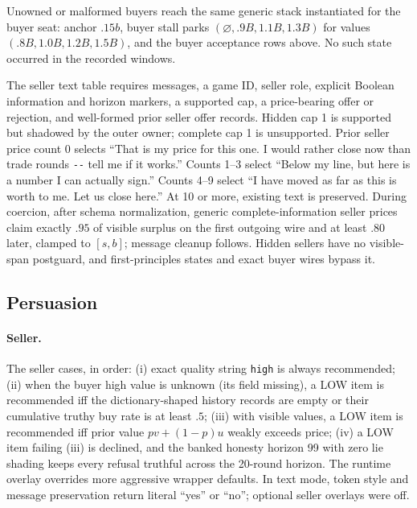 Unowned or malformed buyers reach the same generic stack instantiated for the
buyer seat: anchor $.15b$, buyer stall parks $(\varnothing,.9B,1.1B,1.3B)$
for values $(.8B,1.0B,1.2B,1.5B)$, and the buyer acceptance rows above. No
such state occurred in the recorded windows.

The seller text table requires messages, a game ID, seller role, explicit
Boolean information and horizon markers, a supported cap, a price-bearing offer
or rejection, and well-formed prior seller offer records. Hidden cap 1 is
supported but shadowed by the outer owner; complete cap 1 is unsupported. Prior
seller price count 0 selects ``That is my price for this one. I would rather
close now than trade rounds \texttt{-{}-} tell me if it works.'' Counts 1--3
select ``Below my line, but here is a number I can actually sign.'' Counts 4--9
select ``I have moved as far as this is worth to me. Let us close here.'' At 10
or more, existing text is preserved. During coercion, after schema
normalization, generic complete-information seller prices claim exactly $.95$
of visible surplus on the first outgoing wire and at least $.80$ later, clamped
to $[s,b]$; message cleanup follows. Hidden sellers have no visible-span
postguard, and first-principles states and exact buyer wires bypass it.

\subsection{Persuasion}
\label{app:policy-persuasion}

\paragraph{Seller.}
The seller cases, in order: (i) exact quality string \texttt{high} is always
recommended; (ii) when the buyer high value is unknown (its field missing), a
LOW item is recommended iff the dictionary-shaped history records are empty or
their cumulative truthy buy rate is at least $.5$; (iii) with visible values,
a LOW item is recommended iff prior value $pv+(1-p)u$ weakly exceeds price;
(iv) a LOW item failing (iii) is declined, and the banked honesty horizon 99
with zero lie shading keeps every refusal truthful across the 20-round
horizon. The runtime
overlay overrides more aggressive wrapper defaults. In text mode, token style
and message preservation return literal ``yes'' or ``no''; optional seller
overlays were off.

